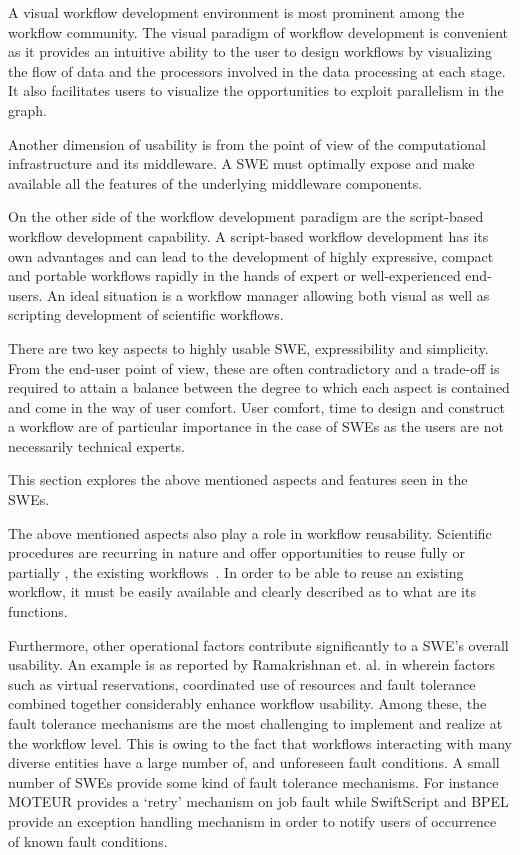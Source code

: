 A visual workflow development environment is most prominent among the workflow
community. The visual paradigm of workflow development is convenient as it
provides an intuitive ability to the user to design workflows by visualizing
the flow of data and the processors involved in the data processing at each
stage. It also facilitates users to visualize the opportunities to exploit
parallelism in the graph.

Another dimension of usability is from the point of view of the computational
infrastructure and its middleware. A SWE must optimally expose and make
available all the features of the underlying middleware components.

On the other side of the workflow development paradigm are the script-based
workflow development capability. A script-based workflow development has its
own advantages and can lead to the development of highly expressive, compact
and portable workflows rapidly in the hands of expert or well-experienced
end-users. An ideal situation is a workflow manager allowing both visual as
well as scripting development of scientific workflows.

There are two key aspects to highly usable SWE, expressibility and simplicity.
From the end-user point of view, these are often contradictory and a trade-off
is required to attain a balance between the degree to which each aspect is
contained and come in the way of user comfort. User comfort, time to design and
construct a workflow are of particular importance in the case of SWEs as the
users are not necessarily technical experts.

This section explores the above mentioned aspects and features seen in the
SWEs.

The above mentioned aspects also play a role in workflow reusability.
Scientific procedures are recurring in nature and offer opportunities to reuse
fully or partially , the existing workflows~\cite{xiaorong-madey:2007}. In
order to be able to reuse an existing workflow, it must be easily available and
clearly described as to what are its functions.

Furthermore, other operational factors contribute significantly to a SWE's
overall usability. An example is as reported by Ramakrishnan et. al. in
\cite{ramakrishnan-nurmi-etal:2009} wherein factors such as virtual
reservations, coordinated use of resources and fault tolerance combined
together considerably enhance workflow usability. Among these, the fault
tolerance mechanisms are the most challenging to implement and realize at the
workflow level. This is owing to the fact that workflows interacting with many
diverse entities have a large number of, and unforeseen fault conditions. A
small number of SWEs provide some kind of fault tolerance mechanisms. For
instance MOTEUR provides a `retry' mechanism on job fault while SwiftScript and
BPEL provide an exception handling mechanism in order to notify users of
occurrence of known fault conditions.

